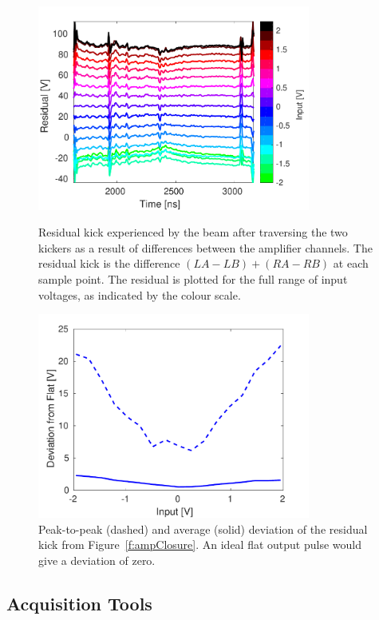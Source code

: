 \begin{figure}
  \centering
  \includegraphics[width=0.8\textwidth]{Figures/commissioning/residualKick_Traces}
  \caption{Residual kick experienced by the beam after traversing the two kickers as a result of differences between the amplifier channels. The residual kick is the difference \((LA-LB)+(RA-RB)\) at each sample point. The residual is plotted for the full range of input voltages, as indicated by the colour scale.}
  \label{f:ampClosure}
  \includegraphics[width=0.8\textwidth]{Figures/commissioning/residualKick_Flatness}
  \caption{Peak-to-peak (dashed) and average (solid) deviation of the residual kick from Figure~\ref{f:ampClosure}. An ideal flat output pulse would give a deviation of zero.}
  \label{f:ampClosureFlatness}
\end{figure}


\subsection{Acquisition Tools}
\label{ss:acqTools}

